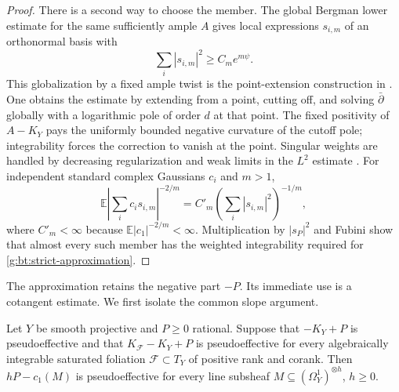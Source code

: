 \begin{proof}
There is a second way to choose the member.  The global Bergman lower
estimate for the same sufficiently ample $A$ gives local expressions
$s_{i,m}$ of an orthonormal basis with
\[
                   \sum_i|s_{i,m}|^2\geq C_m e^{m\psi}.
\]
This globalization by a fixed ample twist is the point-extension
construction in \cite[Section~9, proof of Proposition~9.1]{Demailly1993}.
One obtains the estimate by extending from a point, cutting off, and
solving $\bar\partial$ globally with a logarithmic pole of order $d$ at
that point.  The fixed positivity of $A-K_Y$ pays the uniformly bounded
negative curvature of the cutoff pole; integrability forces the
correction to vanish at the point.  Singular weights are handled by
decreasing regularization and weak limits in the $L^2$ estimate
\cite[Corollary~13.9, Remark~13.10, and Theorem~14.2]{raDemailly}.
For independent standard complex Gaussians $c_i$ and $m>1$,
\[
 \mathbb E\left|\sum_i c_i s_{i,m}\right|^{-2/m}
   =C'_m\left(\sum_i|s_{i,m}|^2\right)^{-1/m},
\]
where $C'_m<\infty$ because $\mathbb E|c_1|^{-2/m}<\infty$.
Multiplication by $|s_P|^2$ and Fubini show that almost every such member
has the weighted integrability required for
\eqref{g:bt:strict-approximation}.
\end{proof}

The approximation retains the negative part $-P$.  Its immediate use is
a cotangent estimate.  We first isolate the common slope argument.

\begin{lemma}
\label{g:bt:slope-principle}
Let $Y$ be smooth projective and $P\geq0$ rational.  Suppose that
$-K_Y+P$ is pseudoeffective and that $K_{\mathcal F}-K_Y+P$ is
pseudoeffective for every algebraically integrable saturated foliation
$\mathcal F\subset T_Y$ of positive rank and corank.  Then
$hP-c_1(M)$ is pseudoeffective for every line subsheaf
$M\subseteq(\Omega_Y^1)^{\otimes h}$, $h\geq0$.
\end{lemma}

